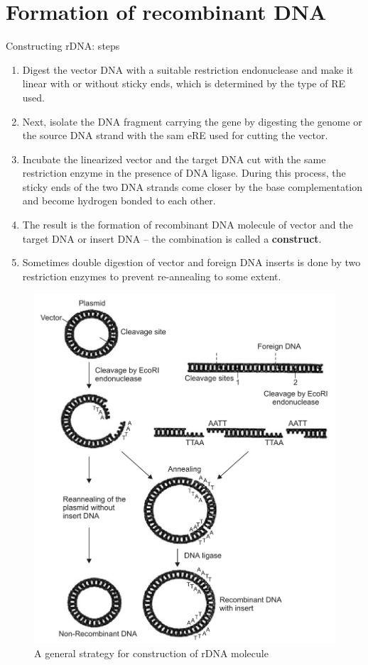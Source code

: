 \documentclass[11pt,dvipsnames,ignorenonframetext,aspectratio=169]{beamer}
\providecommand{\tightlist}{%
  \setlength{\itemsep}{0pt}\setlength{\parskip}{0pt}}
\begin{document}
\hypertarget{formation-of-recombinant-dna}{%
\section{Formation of recombinant
DNA}\label{formation-of-recombinant-dna}}

\begin{frame}{Constructing rDNA: steps}
\protect\hypertarget{constructing-rdna-steps}{}
\begin{enumerate}
\tightlist
\item
  Digest the vector DNA with a suitable restriction endonuclease and
  make it linear with or without sticky ends, which is determined by the
  type of RE used.
\item
  Next, isolate the DNA fragment carrying the gene by digesting the
  genome or the source DNA strand with the sam eRE used for cutting the
  vector.
\item
  Incubate the linearized vector and the target DNA cut with the same
  restriction enzyme in the presence of DNA ligase. During this process,
  the sticky ends of the two DNA strands come closer by the base
  complementation and become hydrogen bonded to each other.
\item
  The result is the formation of recombinant DNA molecule of vector and
  the target DNA or insert DNA -- the combination is called a
  \textbf{construct}.
\item
  Sometimes double digestion of vector and foreign DNA inserts is done
  by two restriction enzymes to prevent re-annealing to some extent.
\end{enumerate}
\end{frame}

\begin{frame}{}
\protect\hypertarget{section-16}{}
\begin{figure}
\includegraphics[width=0.4\linewidth]{./../images/construction_rdna_molecule} \caption{A general strategy for construction of rDNA molecule}\label{fig:rdna-construction}
\end{figure}
\end{frame}
\end{document}
